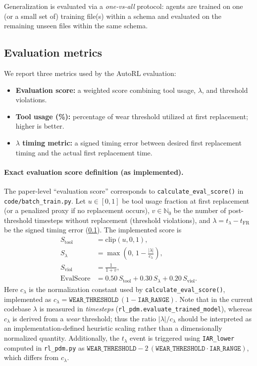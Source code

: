 \documentclass[11pt]{article}
\begin{document}
Generalization is evaluated via a \emph{one-vs-all} protocol: agents are trained on one (or a small set of) training file(s) within a schema and evaluated on the remaining unseen files within the same schema.

\subsection{Evaluation metrics}
\label{sec:metrics}
We report three metrics used by the AutoRL evaluation:
\begin{itemize}
	\item \textbf{Evaluation score:} a weighted score combining tool usage, $\lambda$, and threshold violations.
	\item \textbf{Tool usage (\%):} percentage of wear threshold utilized at first replacement; higher is better.
	\item \textbf{$\lambda$ timing metric:} a signed timing error between desired first replacement timing and the actual first replacement time.
\end{itemize}

\paragraph{Exact evaluation score definition (as implemented).}
The paper-level ``evaluation score'' corresponds to \texttt{calculate\_eval\_score()} in \texttt{code/batch\_train.py}. Let $u\in[0,1]$ be tool usage fraction at first replacement (or a penalized proxy if no replacement occurs), $v\in\mathbb{N}_0$ be the number of post-threshold timesteps without replacement (threshold violations), and $\lambda=t_{\lambda}-t_{\mathrm{FR}}$ be the signed timing error (\cref{sec:metrics}). The implemented score is
\begin{align}
S_{\text{tool}} &= \mathrm{clip}(u,0,1),\\
S_{\lambda} &= \max\left(0,\,1-\frac{|\lambda|}{c_{\lambda}}\right),\\
S_{\text{viol}} &= \frac{1}{1+v},\\
\mathrm{EvalScore} &= 0.50\,S_{\text{tool}} + 0.30\,S_{\lambda} + 0.20\,S_{\text{viol}}.
\end{align}
Here $c_{\lambda}$ is the normalization constant used by \texttt{calculate\_eval\_score()}, implemented as $c_{\lambda}=\texttt{WEAR\_THRESHOLD}\,(1-\texttt{IAR\_RANGE})$. Note that in the current codebase $\lambda$ is measured in \emph{timesteps} (\texttt{rl\_pdm.evaluate\_trained\_model}), whereas $c_{\lambda}$ is derived from a \emph{wear} threshold; thus the ratio $|\lambda|/c_{\lambda}$ should be interpreted as an implementation-defined heuristic scaling rather than a dimensionally normalized quantity. Additionally, the $t_{\lambda}$ event is triggered using \texttt{IAR\_lower} computed in \texttt{rl\_pdm.py} as $\texttt{WEAR\_THRESHOLD}-2\,(\texttt{WEAR\_THRESHOLD}\cdot\texttt{IAR\_RANGE})$, which differs from $c_{\lambda}$.
\end{document}
